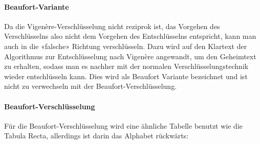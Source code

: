\paragraph{Beaufort-Variante}
\label{sec:v-beaufort-var}
Da die Vigenère-Verschlüsselung nicht reziprok ist, das Vorgehen des Verschlüsselns also nicht dem Vorgehen des Entschlüsselns entspricht, kann man auch in die «falsche» Richtung verschlüsseln. Dazu wird auf den Klartext der Algorithmus zur Entschlüsselung nach Vigenère angewandt, um den Geheimtext zu erhalten, sodass man es nachher mit der normalen Verschlüsselungstechnik wieder entschlüsseln kann. Dies wird als Beaufort Variante bezeichnet und ist nicht zu verwechseln mit der Beaufort-Verschlüsselung. \cite{boxentriq:variant_beaufort}

\paragraph{Beaufort-Verschlüsselung}
\label{sec:v-beaufort-verschluesselung}
Für die Beaufort-Verschlüsselung wird eine ähnliche Tabelle benutzt wie die Tabula Recta, allerdings ist darin das Alphabet rückwärts: \cite{wikipedia:beaufort}

